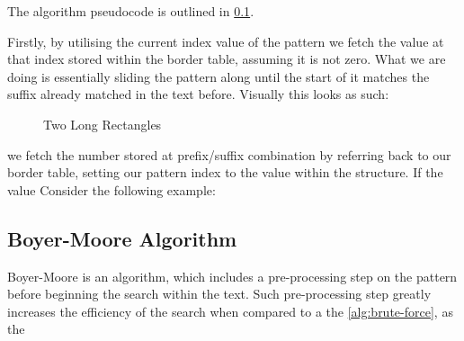 \documentclass{l4proj}
\begin{document}
The algorithm pseudocode is outlined in \ref{}.

Firstly, by utilising the current index value of the pattern we fetch the value at that index stored within the border table, assuming it is not zero. What we are doing is essentially sliding the pattern along until the start of it matches the suffix already matched in the text before. Visually this looks as such:



\begin{figure}
  \centering
  \caption{Two Long Rectangles}
\end{figure}







we fetch the number stored at prefix/suffix combination by referring back to our border table, setting our pattern index to the value within the structure. If the value  Consider the following example:



\subsection{Boyer-Moore Algorithm}

Boyer-Moore is an algorithm, which includes a pre-processing step on the pattern before beginning the search within the text. Such pre-processing step greatly increases the efficiency of the search when compared to a the \ref{alg:brute-force}, as the


\end{document}
